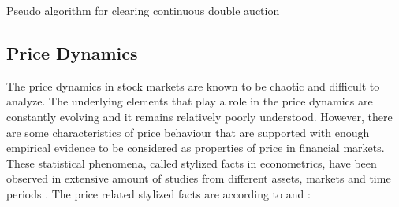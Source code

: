 \begin{algorithm}[H]
    \SetAlgoLined
    \DontPrintSemicolon

    \caption{Pseudo algorithm for clearing continuous double auction}
    \label{alg:lob_cont}
\end{algorithm}



\subsection{Price Dynamics}
The price dynamics in stock markets are known to be chaotic and difficult to 
analyze. The underlying elements that play a role in the price dynamics
are constantly evolving and it remains relatively poorly understood.
However, there are some characteristics of price behaviour that are supported
with enough empirical evidence to be considered as properties of price in
financial markets. These statistical phenomena, called stylized facts in
econometrics, have been observed in extensive amount of studies from 
different assets, markets and time periods \citep{Shakeel18}. 
The price related stylized facts are according to \citet{StylizedFacts01} and \citet{lob13}:

